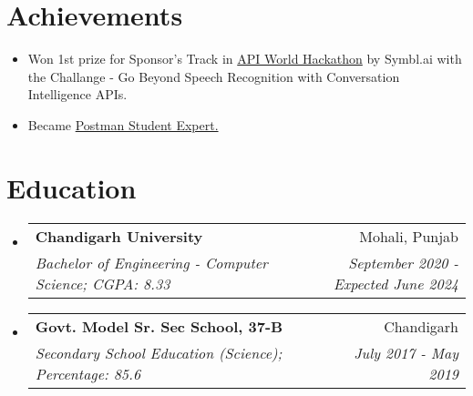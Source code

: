 \documentclass[apaper,20pt]{article}
\makeatletter
\newcommand{\resumeSubheading}[4]{
  \vspace{-1pt}\item
    \begin{tabular*}{0.97\textwidth}{l@{\extracolsep{\fill}}r}
      \textbf{#1} & #2 \\
      \textit{#3} & \textit{#4} \\
    \end{tabular*}\vspace{-5pt}
}
\newcommand{\resumeSubHeadingListStart}{\begin{itemize}[leftmargin=*]}
\newcommand{\resumeSubHeadingListEnd}{\end{itemize}}
\makeatother
\begin{document}

\vspace{-3pt}

\section{Achievements}
\begin{itemize}[labelsep=*,label=$\circ$,leftmargin=0.9pc]
	\item {Won 1st prize for Sponsor's Track in {\href{https://devpost.com/software/feedback-prime-kbg8um}{API World Hackathon}} by Symbl.ai with the Challange - Go Beyond Speech Recognition with Conversation Intelligence APIs.}
	      \vspace{-5pt}
	\item {Became {\href{https://badgr.com/public/assertions/DNG85AU6SYWaX6XO5gkoDw?identity__email=nitish.sharma1186@gmail.com}{Postman Student Expert.}}}
\end{itemize}


\vspace{-6pt}

\section{Education}
\resumeSubHeadingListStart
\resumeSubheading
{Chandigarh University}{Mohali, Punjab}
{Bachelor of Engineering - Computer Science;  CGPA: 8.33}{September 2020 - Expected June 2024}
\vspace{0pt}
\resumeSubheading
{Govt. Model Sr. Sec School, 37-B}{Chandigarh}
{Secondary School Education (Science);  Percentage: 85.6}{July 2017 - May 2019}
\resumeSubHeadingListEnd
\end{document}
